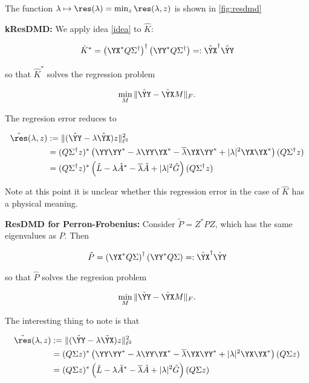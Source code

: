 The function $\lambda \mapsto \res (\lambda) = \min_z \res (\lambda, z)$ is shown in 
\ref{fig:resdmd}

\textbf{kResDMD:} We apply idea \ref{idea} to $\hat{K}$: 

\begin{equation}
    \hat{K}^* = \left( \YX^* Q \Sigma^\dagger \right)^\dagger 
    \left( \YY^* Q \Sigma^\dagger \right) =:
    \hat{\YX}^\dagger \hat{\YY}
\end{equation}

so that $\hat{K}^*$ solves the regression problem

\begin{equation}
    \min_M \| \hat{\YY} - \hat{\YX} M \|_F . 
\end{equation}

The regresion error reduces to

\begin{align}
    \hat{\res} (\lambda, z) 
    &:= \| ( \hat{\YY} - \lambda \hat{\YX} ) z \|_{\ell^2}^2 \\
    &= (Q \Sigma^\dagger z)^* \left( 
        \YY \YY^* 
        - \lambda \YY \YX^* 
        - \overline{\lambda} \YX \YY^* 
        + | \lambda |^2 \YX \YX^*
    \right) (Q \Sigma^\dagger z) \\
    &= (Q \Sigma^\dagger z)^* \left( 
        \hat{L}
        - \lambda \hat{A}^*
        - \overline{\lambda} \hat{A}
        + | \lambda |^2 \hat{G}
    \right) (Q \Sigma^\dagger z)
\end{align}

Note at this point it is unclear whether this regression error in the case of $\hat{K}$ 
has a physical meaning. 

\textbf{ResDMD for Perron-Frobenius:} Consider $\tilde{P} = Z^* P Z$, which has the same 
eigenvalues as $P$. Then 

\begin{equation}
    \tilde{P} = \left( \YX^* Q \Sigma \right)^\dagger \left( \YY^* Q \Sigma \right) =:
    \tilde{\YX}^\dagger \tilde{\YY}
\end{equation}

so that $\hat{P}$ solves the regresion problem

\begin{equation}
    \min_M \| \tilde{\YY} - \tilde{\YX} M \|_F . 
\end{equation}

The interesting thing to note is that 

\begin{align}
    \tilde{\res} (\lambda, z)
    &:= \| ( \tilde{\YY} - \lambda \tilde{\YX} ) z \|_{\ell^2}^2 \\
    &= (Q \Sigma z)^* \left( 
        \YY \YY^* 
        - \lambda \YY \YX^* 
        - \overline{\lambda} \YX \YY^* 
        + | \lambda |^2 \YX \YX^*
    \right) (Q \Sigma z) \\
    &= (Q \Sigma z)^* \left( 
        \hat{L}
        - \lambda \hat{A}^*
        - \overline{\lambda} \hat{A}
        + | \lambda |^2 \hat{G}
    \right) (Q \Sigma z)
\end{align}

